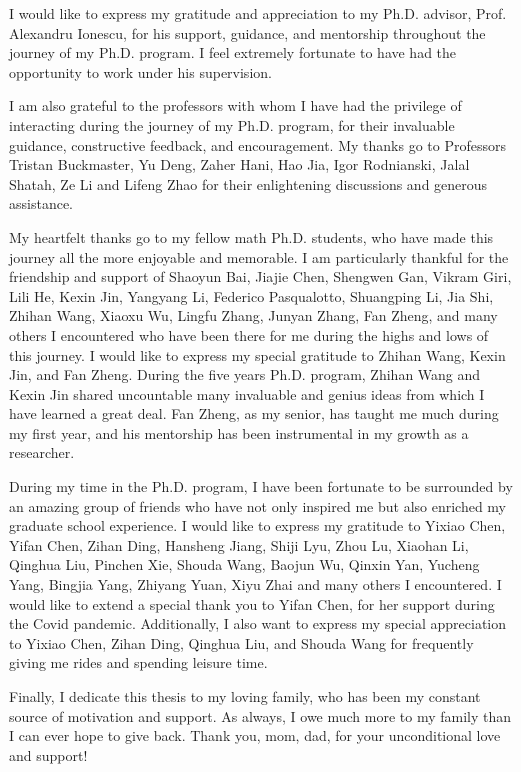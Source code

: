 I would like to express my gratitude and appreciation to my Ph.D. advisor, Prof. Alexandru Ionescu, for his support, guidance, and mentorship throughout the journey of my Ph.D. program. I feel extremely fortunate to have had the opportunity to work under his supervision.

I am also grateful to the professors with whom I have had the privilege of interacting during the journey of my Ph.D. program, for their invaluable guidance, constructive feedback, and encouragement. My thanks go to Professors Tristan Buckmaster, Yu Deng, Zaher Hani, Hao Jia, Igor Rodnianski, Jalal Shatah, Ze Li and Lifeng Zhao for their enlightening discussions and generous assistance.

My heartfelt thanks go to my fellow math Ph.D. students, who have made this journey all the more enjoyable and memorable. I am particularly thankful for the friendship and support of Shaoyun Bai, Jiajie Chen, Shengwen Gan, Vikram Giri, Lili He, Kexin Jin, Yangyang Li, Federico Pasqualotto, Shuangping Li, Jia Shi, Zhihan Wang, Xiaoxu Wu, Lingfu Zhang, Junyan Zhang, Fan Zheng, and many others I encountered who have been there for me during the highs and lows of this journey. I would like to express my special gratitude to Zhihan Wang, Kexin Jin, and Fan Zheng. During the five years Ph.D. program, Zhihan Wang and Kexin Jin shared uncountable many invaluable and genius ideas from which I have learned a great deal.  Fan Zheng, as my senior, has taught me much during my first year, and his mentorship has been instrumental in my growth as a researcher.


During my time in the Ph.D. program, I have been fortunate to be surrounded by an amazing group of friends who have not only inspired me but also enriched my graduate school experience. I would like to express my gratitude to Yixiao Chen, Yifan Chen, Zihan Ding, Hansheng Jiang, Shiji Lyu, Zhou Lu, Xiaohan Li, Qinghua Liu, Pinchen Xie, Shouda Wang, Baojun Wu, Qinxin Yan, Yucheng Yang, Bingjia Yang, Zhiyang Yuan, Xiyu Zhai and many others I encountered. I would like to extend a special thank you to Yifan Chen, for her support during the Covid pandemic. Additionally, I also want to express my special appreciation to Yixiao Chen, Zihan Ding, Qinghua Liu, and Shouda Wang for frequently giving me rides and spending leisure time.

Finally, I dedicate this thesis to my loving family, who has been my constant source of motivation and support. As always, I owe much more to my family than I can ever hope to give back. Thank you, mom, dad, for your unconditional love and support!

\newpage

\ 

\vspace{20em}

